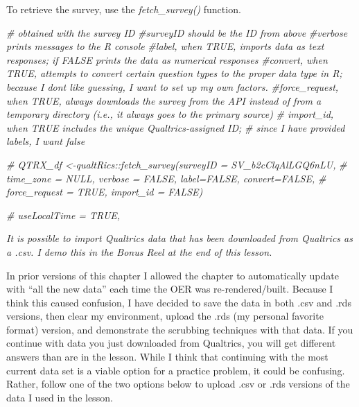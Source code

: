 \documentclass[
  11pt,
]{book}
\newenvironment{Shaded}{\begin{snugshade}}{\end{snugshade}}
\newcommand{\CommentTok}[1]{\textcolor[rgb]{0.37,0.37,0.37}{\textit{#1}}}
\begin{document}
To retrieve the survey, use the \emph{fetch\_survey()} function.

\begin{Shaded}
\begin{Highlighting}[]
\CommentTok{\# obtained with the survey ID}
\CommentTok{\#\textquotesingle{}surveyID\textquotesingle{} should be the ID from above}
\CommentTok{\#\textquotesingle{}verbose\textquotesingle{} prints messages to the R console}
\CommentTok{\#\textquotesingle{}label\textquotesingle{}, when TRUE, imports data as text responses; if FALSE prints the data as numerical responses}
\CommentTok{\#\textquotesingle{}convert\textquotesingle{}, when TRUE, attempts to convert certain question types to the \textquotesingle{}proper\textquotesingle{} data type in R; because I don\textquotesingle{}t like guessing, I want to set up my own factors.}
\CommentTok{\#\textquotesingle{}force\_request\textquotesingle{}, when TRUE, always downloads the survey from the API instead of from a temporary directory (i.e., it always goes to the primary source)}
\CommentTok{\# \textquotesingle{}import\_id\textquotesingle{}, when TRUE includes the unique Qualtrics{-}assigned ID;}
\CommentTok{\# since I have provided labels, I want false}

\CommentTok{\# QTRX\_df \textless{}{-}qualtRics::fetch\_survey(surveyID = \textquotesingle{}SV\_b2cClqAlLGQ6nLU\textquotesingle{},}
\CommentTok{\# time\_zone = NULL, verbose = FALSE, label=FALSE, convert=FALSE,}
\CommentTok{\# force\_request = TRUE, import\_id = FALSE)}

\CommentTok{\# useLocalTime = TRUE,}
\end{Highlighting}
\end{Shaded}

\emph{It is possible to import Qualtrics data that has been downloaded from Qualtrics as a .csv. I demo this in the Bonus Reel at the end of this lesson.}

In prior versions of this chapter I allowed the chapter to automatically update with ``all the new data'' each time the OER was re-rendered/built. Because I think this caused confusion, I have decided to save the data in both .csv and .rds versions, then clear my environment, upload the .rds (my personal favorite format) version, and demonstrate the scrubbing techniques with that data. If you continue with data you just downloaded from Qualtrics, you will get different answers than are in the lesson. While I think that continuing with the most current data set is a viable option for a practice problem, it could be confusing. Rather, follow one of the two options below to upload .csv or .rds versions of the data I used in the lesson.
\end{document}
